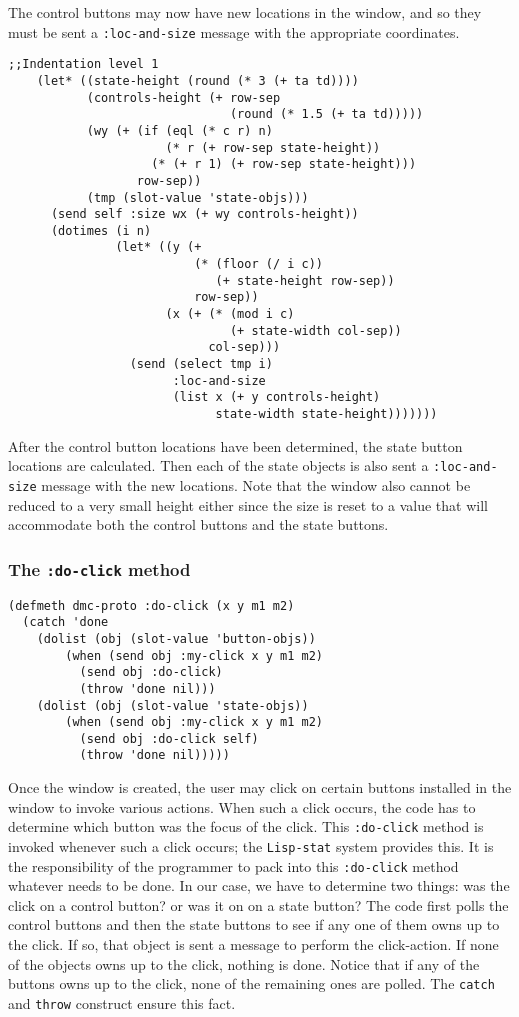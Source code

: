 The control buttons may now have new locations in the window, and so
they must be sent a {\tt :loc-and-size} message with the appropriate
coordinates.  
\begin{verbatim}
;;Indentation level 1
    (let* ((state-height (round (* 3 (+ ta td))))
           (controls-height (+ row-sep 
                               (round (* 1.5 (+ ta td)))))
           (wy (+ (if (eql (* c r) n)
                      (* r (+ row-sep state-height))
                    (* (+ r 1) (+ row-sep state-height))) 
                  row-sep))
           (tmp (slot-value 'state-objs)))
      (send self :size wx (+ wy controls-height))
      (dotimes (i n)
               (let* ((y (+ 
                          (* (floor (/ i c)) 
                             (+ state-height row-sep)) 
                          row-sep))
                      (x (+ (* (mod i c) 
                               (+ state-width col-sep)) 
                            col-sep)))
                 (send (select tmp i) 
                       :loc-and-size 
                       (list x (+ y controls-height) 
                             state-width state-height)))))))
\end{verbatim}
After the control button locations have been determined, the state
button locations are calculated.  Then each of the state objects is
also sent a {\tt :loc-and-size} message with the new locations.  Note
that the window also cannot be reduced to a very small height either
since the size is reset to a value that will accommodate both the
control buttons and the state buttons. 

\subsubsection{The {\tt :do-click} method}
\label{subsubsec:dmc-do-click}
\begin{verbatim}
(defmeth dmc-proto :do-click (x y m1 m2)
  (catch 'done
    (dolist (obj (slot-value 'button-objs))
	    (when (send obj :my-click x y m1 m2)
		  (send obj :do-click)
		  (throw 'done nil)))
    (dolist (obj (slot-value 'state-objs))
	    (when (send obj :my-click x y m1 m2)
		  (send obj :do-click self)
		  (throw 'done nil)))))
\end{verbatim}
Once the window is created, the user may click on certain buttons
installed in the window to invoke various actions.  When such a click
occurs, the code has to determine which button was the focus of the
click. This {\tt :do-click} method is invoked whenever such a click
occurs; the {\tt Lisp-stat} system provides this. It is the
responsibility of the programmer to pack into this {\tt :do-click}
method whatever needs to be done.  In our case, we have to determine
two things: was the click on a control button? or was it on on a state
button?  The code first polls the control buttons and then the state
buttons to see if any one of them owns up to the click.  If so, that
object is sent a message to perform the click-action.  If none of the
objects owns up to the click, nothing is done. Notice that if any of
the  buttons owns up to the click, none of the remaining ones are
polled. The {\tt catch} and {\tt throw} construct ensure this fact.

